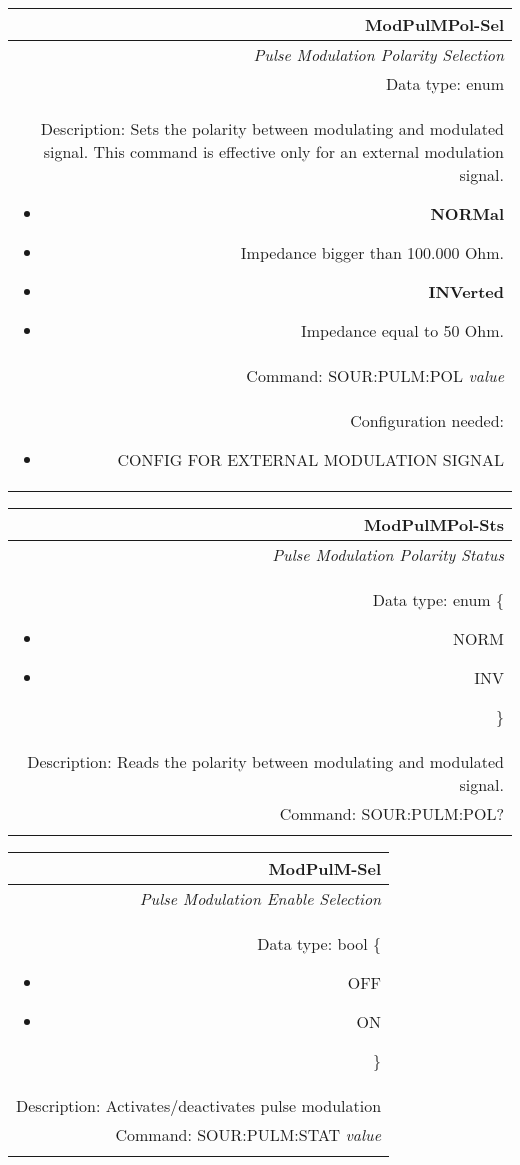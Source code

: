 \documentclass[openany]{article}
\begin{document}
		\begin{tabular}{N}
			\hline
			\bfseries ModPulMPol-Sel \\ \hline
			\emph{Pulse Modulation Polarity Selection} \\
			Data type: enum \\  
			Description: Sets the polarity between modulating and modulated signal. This command is effective only for an external modulation signal.\begin{itemize}[noitemsep]
				\small
				\item[] \textbf{NORMal}
                                \item[] Impedance bigger than 100.000 Ohm.
                                \item[] \textbf{INVerted}
                                \item[] Impedance equal to 50 Ohm.
			\end{itemize} \\
			Command: SOUR:PULM:POL \emph{value} \\
			Configuration needed:\begin{itemize}[noitemsep]
				\small
				\item[] CONFIG FOR EXTERNAL MODULATION SIGNAL
			\end{itemize} \\

		\end{tabular}


		\begin{tabular}{N}
			\hline
			\bfseries ModPulMPol-Sts \\ \hline
			\emph{Pulse Modulation Polarity Status} \\
			Data type: enum \{\begin{itemize}[noitemsep]
				\small
				\item[] NORM
				\item[] INV
			\end{itemize}\} \\ 
			Description: Reads the polarity between modulating and modulated signal. \\
			Command: SOUR:PULM:POL? \\
			\\

		\end{tabular}


		\begin{tabular}{N}
			\hline
			\bfseries ModPulM-Sel \\ \hline
			\emph{Pulse Modulation Enable Selection} \\
			Data type: bool \{\begin{itemize}[noitemsep]
				\small
				\item[] OFF
				\item[] ON
			\end{itemize}\} \\
			Description: Activates/deactivates pulse modulation\\
			Command: SOUR:PULM:STAT \emph{value} \\
			\\

		\end{tabular}
\end{document}
